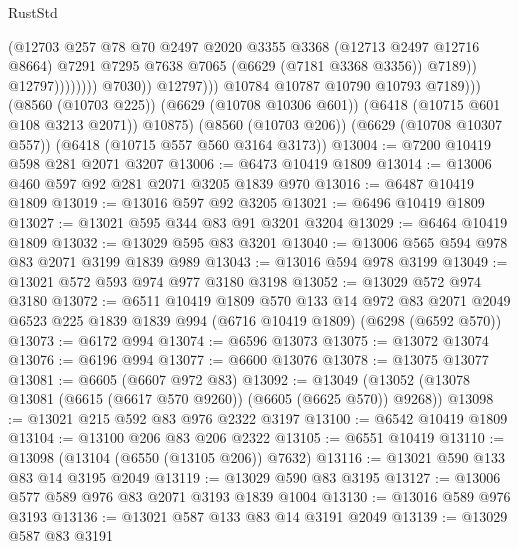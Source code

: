 \begin{lexlean}{RustStd}
\begin{coremodule}
                                        (@12703
                                          @257
                                          @78
                                          @70
                                          @2497
                                          @2020
                                          @3355
                                          @3368
                                          (@12713 @2497 @12716 @8664)
                                          @7291
                                          @7295
                                          @7638
                                          @7065
                                          (@6629 (@7181 @3368 @3356))
                                          @7189))
                                      @12797))))))))
                      @7030))
                  @12797)))
            @10784
            @10787
            @10790
            @10793
            @7189)))
      (@8560 (@10703 @225))
      (@6629 (@10708 @10306 @601))
      (@6418 (@10715 @601 @108 @3213 @2071))
      @10875)
    (@8560 (@10703 @206))
    (@6629 (@10708 @10307 @557))
    (@6418 (@10715 @557 @560 @3164 @3173))
@13004 := @7200 @10419 @598 @281 @2071 @3207
@13006 := @6473 @10419 @1809
@13014 := @13006 @460 @597 @92 @281 @2071 @3205 @1839 @970
@13016 := @6487 @10419 @1809
@13019 := @13016 @597 @92 @3205
@13021 := @6496 @10419 @1809
@13027 := @13021 @595 @344 @83 @91 @3201 @3204
@13029 := @6464 @10419 @1809
@13032 := @13029 @595 @83 @3201
@13040 := @13006 @565 @594 @978 @83 @2071 @3199 @1839 @989
@13043 := @13016 @594 @978 @3199
@13049 := @13021 @572 @593 @974 @977 @3180 @3198
@13052 := @13029 @572 @974 @3180
@13072 := @6511
    @10419
    @1809
    @570
    @133
    @14
    @972
    @83
    @2071
    @2049
    @6523
    @225
    @1839
    @1839
    @994
    (@6716 @10419 @1809)
    (@6298 (@6592 @570))
@13073 := @6172 @994
@13074 := @6596 @13073
@13075 := @13072 @13074
@13076 := @6196 @994
@13077 := @6600 @13076
@13078 := @13075 @13077
@13081 := @6605 (@6607 @972 @83)
@13092 := @13049 (@13052 (@13078 @13081 (@6615 (@6617 @570 @9260)) (@6605 (@6625 @570)) @9268))
@13098 := @13021 @215 @592 @83 @976 @2322 @3197
@13100 := @6542 @10419 @1809
@13104 := @13100 @206 @83 @206 @2322
@13105 := @6551 @10419
@13110 := @13098 (@13104 (@6550 (@13105 @206)) @7632)
@13116 := @13021 @590 @133 @83 @14 @3195 @2049
@13119 := @13029 @590 @83 @3195
@13127 := @13006 @577 @589 @976 @83 @2071 @3193 @1839 @1004
@13130 := @13016 @589 @976 @3193
@13136 := @13021 @587 @133 @83 @14 @3191 @2049
@13139 := @13029 @587 @83 @3191

\end{coremodule}
\end{lexlean}
